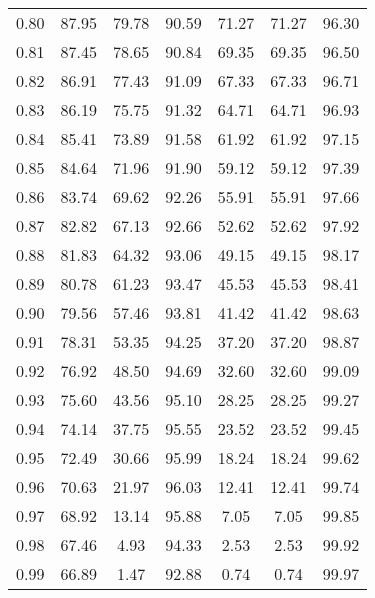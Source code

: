\begin{tabular}{|c|c|c|c|c|c|c|}
      0.80 &     87.95 &     79.78 &      90.59 &   71.27 &      71.27 &         96.30 \\
      0.81 &     87.45 &     78.65 &      90.84 &   69.35 &      69.35 &         96.50 \\
      0.82 &     86.91 &     77.43 &      91.09 &   67.33 &      67.33 &         96.71 \\
      0.83 &     86.19 &     75.75 &      91.32 &   64.71 &      64.71 &         96.93 \\
      0.84 &     85.41 &     73.89 &      91.58 &   61.92 &      61.92 &         97.15 \\
      0.85 &     84.64 &     71.96 &      91.90 &   59.12 &      59.12 &         97.39 \\
      0.86 &     83.74 &     69.62 &      92.26 &   55.91 &      55.91 &         97.66 \\
      0.87 &     82.82 &     67.13 &      92.66 &   52.62 &      52.62 &         97.92 \\
      0.88 &     81.83 &     64.32 &      93.06 &   49.15 &      49.15 &         98.17 \\
      0.89 &     80.78 &     61.23 &      93.47 &   45.53 &      45.53 &         98.41 \\
      0.90 &     79.56 &     57.46 &      93.81 &   41.42 &      41.42 &         98.63 \\
      0.91 &     78.31 &     53.35 &      94.25 &   37.20 &      37.20 &         98.87 \\
      0.92 &     76.92 &     48.50 &      94.69 &   32.60 &      32.60 &         99.09 \\
      0.93 &     75.60 &     43.56 &      95.10 &   28.25 &      28.25 &         99.27 \\
      0.94 &     74.14 &     37.75 &      95.55 &   23.52 &      23.52 &         99.45 \\
      0.95 &     72.49 &     30.66 &      95.99 &   18.24 &      18.24 &         99.62 \\
      0.96 &     70.63 &     21.97 &      96.03 &   12.41 &      12.41 &         99.74 \\
      0.97 &     68.92 &     13.14 &      95.88 &    7.05 &       7.05 &         99.85 \\
      0.98 &     67.46 &      4.93 &      94.33 &    2.53 &       2.53 &         99.92 \\
      0.99 &     66.89 &      1.47 &      92.88 &    0.74 &       0.74 &         99.97 \\
\bottomrule
\end{tabular}
